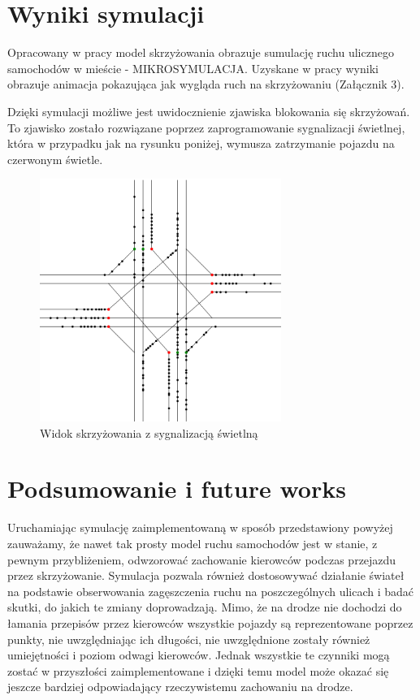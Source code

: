 \documentclass{sprawozdanie-agh}
\begin{document}
	\section{Wyniki symulacji}

	Opracowany w pracy model skrzyżowania obrazuje sumulację ruchu ulicznego samochodów w mieście - MIKROSYMULACJA. Uzyskane w pracy wyniki obrazuje animacja pokazująca jak wygląda ruch na skrzyżowaniu (Załącznik 3).

	Dzięki symulacji możliwe jest uwidocznienie zjawiska blokowania się skrzyżowań. To zjawisko zostało rozwiązane poprzez zaprogramowanie sygnalizacji świetlnej, która w przypadku jak na rysunku poniżej, wymusza zatrzymanie pojazdu na czerwonym świetle.

	\begin{figure}[H]
		\centering
		\captionsetup{justification=centering}
		\includegraphics[width=0.7\textwidth]{symulacja}
		\caption{Widok skrzyżowania z sygnalizacją świetlną}
		\label{fig:Wyniki_sym_1}
	\end{figure}

	\section{Podsumowanie i future works}

	Uruchamiając symulację zaimplementowaną w sposób przedstawiony powyżej zauważamy, że nawet tak prosty model ruchu samochodów jest w stanie, z pewnym przybliżeniem, odwzorować zachowanie kierowców podczas przejazdu przez skrzyżowanie. Symulacja pozwala również dostosowywać działanie świateł na podstawie obserwowania zagęszczenia ruchu na poszczególnych ulicach i badać skutki, do jakich te zmiany doprowadzają. Mimo, że na drodze nie dochodzi do łamania przepisów przez kierowców wszystkie pojazdy są reprezentowane poprzez punkty, nie uwzględniając ich długości, nie uwzględnione zostały również umiejętności i poziom odwagi kierowców. Jednak wszystkie te czynniki mogą zostać w przyszłości zaimplementowane i dzięki temu model może okazać się jeszcze bardziej odpowiadający rzeczywistemu zachowaniu na drodze.
\end{document}
